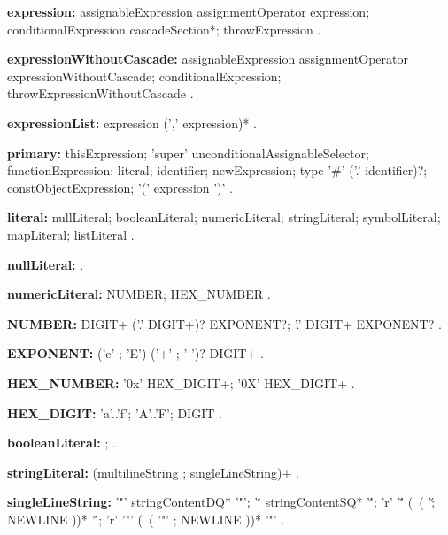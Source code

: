 \begin{grammar}
{\bf expression:}
    assignableExpression assignmentOperator expression;
    conditionalExpression cascadeSection*;
    throwExpression     
    .

{\bf expressionWithoutCascade:}
    assignableExpression assignmentOperator expressionWithoutCascade;
    conditionalExpression;
    throwExpressionWithoutCascade    
    .

{\bf expressionList:}
    expression (',' expression)*
    .
\end{grammar}
\begin{grammar}
{\bf primary:}
    thisExpression;
    'super' unconditionalAssignableSelector;
    functionExpression;
    literal;
    identifier;
    newExpression;
    \NEW{} type '\#' ('.' identifier)?;
    constObjectExpression;
    '(' expression ')'
    .
\end{grammar}
\begin{grammar}
{\bf literal:}
    nullLiteral;
    booleanLiteral;
    numericLiteral;
    stringLiteral;
    symbolLiteral;
    mapLiteral;
    listLiteral
    .
\end{grammar}
\begin{grammar}
{\bf nullLiteral:}
    \NULL{}
    .
\end{grammar}
\begin{grammar}
{\bf numericLiteral:}
    NUMBER;
    HEX_NUMBER
    .
    
{\bf NUMBER:}
    DIGIT+ ('.' DIGIT+)? EXPONENT?;
    '.' DIGIT+ EXPONENT?
    .

{\bf EXPONENT:}
    ('e' ; 'E') ('+' ; '-')? DIGIT+
    .

{\bf HEX_NUMBER:}
    '0x' HEX_DIGIT+;
    '0X' HEX_DIGIT+
    .

 {\bf HEX_DIGIT:}
    'a'..'f';
    'A'..'F';
    DIGIT
    .
\end{grammar}
\begin{grammar}
{\bf booleanLiteral:}
    \TRUE{};
    \FALSE{}
    .
\end{grammar}
\begin{grammar}
{\bf stringLiteral:}
    (multilineString ; singleLineString)+
    .
\end{grammar}
\begin{grammar}
{\bf singleLineString:}
    '"' stringContentDQ* '"';
    '\'' stringContentSQ* '\'';
    'r' '\'' (~( '\' ; NEWLINE ))* '\'';
    'r' '"' (~( '"' ; NEWLINE ))* '"'
    .
\end{grammar}
